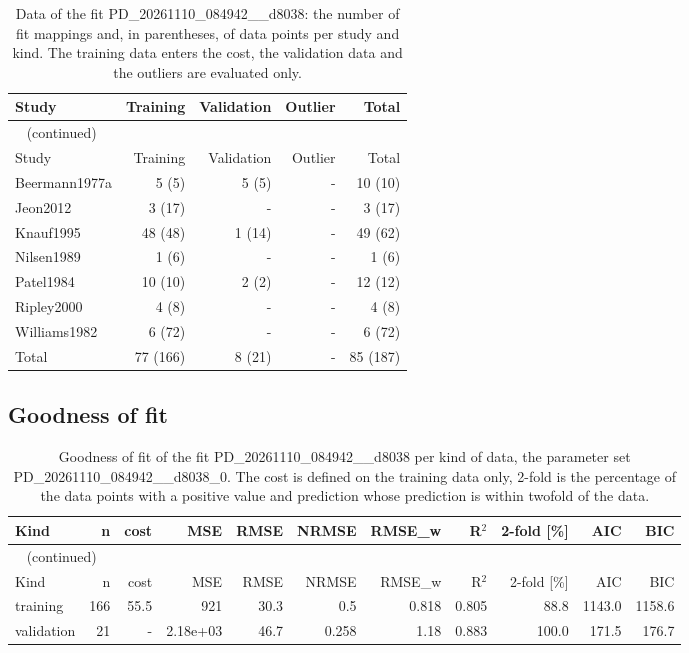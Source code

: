 \documentclass{article}
\begin{document}
\begin{longtable}{lrrrr}
\caption{Data of the fit PD\_20261110\_084942\_\_d8038: the number of fit mappings and, in parentheses, of data points per study and kind. The training data enters the cost, the validation data and the outliers are evaluated only.}\label{tab:data:PD_20261110_084942__d8038} \\
\toprule
Study & Training & Validation & Outlier & Total \\
\midrule
\endfirsthead
\multicolumn{5}{l}{\small\tablename~\thetable{} (continued)} \\
\toprule
Study & Training & Validation & Outlier & Total \\
\midrule
\endhead
\bottomrule
\endlastfoot
Beermann1977a & 5 (5) & 5 (5) & - & 10 (10) \\
Jeon2012 & 3 (17) & - & - & 3 (17) \\
Knauf1995 & 48 (48) & 1 (14) & - & 49 (62) \\
Nilsen1989 & 1 (6) & - & - & 1 (6) \\
Patel1984 & 10 (10) & 2 (2) & - & 12 (12) \\
Ripley2000 & 4 (8) & - & - & 4 (8) \\
Williams1982 & 6 (72) & - & - & 6 (72) \\
Total & 77 (166) & 8 (21) & - & 85 (187) \\
\end{longtable}

\subsection{Goodness of fit}

\begin{longtable}{lrrrrrrrrrr}
\caption{Goodness of fit of the fit PD\_20261110\_084942\_\_d8038 per kind of data, the parameter set PD\_20261110\_084942\_\_d8038\_0. The cost is defined on the training data only, 2-fold is the percentage of the data points with a positive value and prediction whose prediction is within twofold of the data.}\label{tab:metrics:PD_20261110_084942__d8038} \\
\toprule
Kind & n & cost & MSE & RMSE & NRMSE & RMSE\_w & R\ensuremath{^{2}} & 2-fold [\%] & AIC & BIC \\
\midrule
\endfirsthead
\multicolumn{11}{l}{\small\tablename~\thetable{} (continued)} \\
\toprule
Kind & n & cost & MSE & RMSE & NRMSE & RMSE\_w & R\ensuremath{^{2}} & 2-fold [\%] & AIC & BIC \\
\midrule
\endhead
\bottomrule
\endlastfoot
training & 166 & 55.5 & 921 & 30.3 & 0.5 & 0.818 & 0.805 & 88.8 & 1143.0 & 1158.6 \\
validation & 21 & - & 2.18e+03 & 46.7 & 0.258 & 1.18 & 0.883 & 100.0 & 171.5 & 176.7 \\
\end{longtable}
\end{document}
